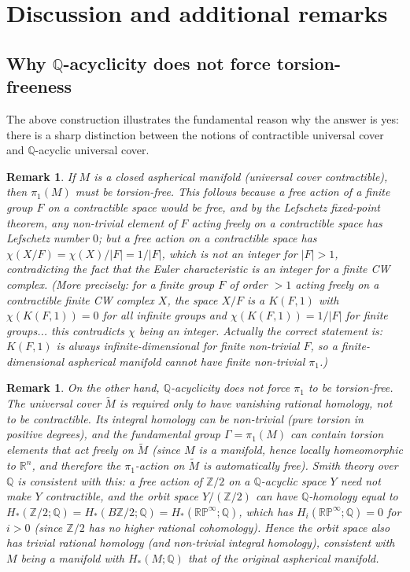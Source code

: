 \documentclass[12pt]{article}
\newtheorem{remark}[theorem]{Remark}
\newcommand{\R}{\mathbb{R}}
\newcommand{\Z}{\mathbb{Z}}
\newcommand{\Q}{\mathbb{Q}}
\newcommand{\RP}{\mathbb{RP}}
\newcommand{\tilM}{\widetilde{M}}
\begin{document}
\section{Discussion and additional remarks}
\label{sec:discussion}

\subsection{Why $\Q$-acyclicity does not force torsion-freeness}

The above construction illustrates the fundamental reason why the answer is yes: there is a
sharp distinction between the notions of contractible universal cover and $\Q$-acyclic universal
cover.

\begin{remark}\label{rem:contractible}
If $M$ is a closed aspherical manifold (universal cover contractible), then $\pi_1(M)$ must be
torsion-free.  This follows because a free action of a finite group $F$ on a contractible space
would be free, and by the Lefschetz fixed-point theorem, any non-trivial element of $F$ acting
freely on a contractible space has Lefschetz number $0$; but a free action on a contractible
space has $\chi(X/F) = \chi(X)/|F| = 1/|F|$, which is not an integer for $|F| > 1$,
contradicting the fact that the Euler characteristic is an integer for a finite CW complex.
(More precisely: for a finite group $F$ of order $>1$ acting freely on a contractible finite
CW complex $X$, the space $X/F$ is a $K(F,1)$ with $\chi(K(F,1)) = 0$ for all infinite groups
and $\chi(K(F,1)) = 1/|F|$ for finite groups... this contradicts $\chi$ being an integer.
Actually the correct statement is: $K(F,1)$ is always infinite-dimensional for finite non-trivial
$F$, so a finite-dimensional aspherical manifold cannot have finite non-trivial $\pi_1$.)
\end{remark}

\begin{remark}\label{rem:Qacyclic}
On the other hand, $\Q$-acyclicity does not force $\pi_1$ to be torsion-free.  The universal
cover $\tilM$ is required only to have vanishing rational homology, not to be contractible.
Its integral homology can be non-trivial (pure torsion in positive degrees), and the
fundamental group $\Gamma = \pi_1(M)$ can contain torsion elements that act freely on $\tilM$
(since $M$ is a manifold, hence locally homeomorphic to $\R^n$, and therefore the $\pi_1$-action
on $\tilM$ is automatically free).  Smith theory over $\Q$ is consistent with this: a free
action of $\Z/2$ on a $\Q$-acyclic space $Y$ need not make $Y$ contractible, and the orbit
space $Y/(\Z/2)$ can have $\Q$-homology equal to $H_*(\Z/2;\Q) = H_*(B\Z/2;\Q) = H_*(\RP^\infty;\Q)$,
which has $H_i(\RP^\infty;\Q) = 0$ for $i > 0$ (since $\Z/2$ has no higher rational cohomology).
Hence the orbit space also has trivial rational homology (and non-trivial integral homology),
consistent with $M$ being a manifold with $H_*(M;\Q)$ that of the original aspherical manifold.
\end{remark}
\end{document}
